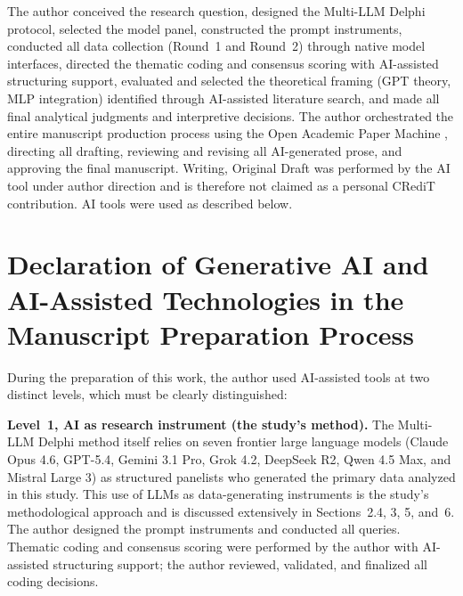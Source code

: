 \documentclass[preprint,review,12pt]{elsarticle}
\begin{document}
The author conceived the research question, designed the Multi-LLM Delphi protocol, selected the model panel, constructed the prompt instruments, conducted all data collection (Round~1 and Round~2) through native model interfaces, directed the thematic coding and consensus scoring with AI-assisted structuring support, evaluated and selected the theoretical framing (GPT theory, MLP integration) identified through AI-assisted literature search, and made all final analytical judgments and interpretive decisions. The author orchestrated the entire manuscript production process using the Open Academic Paper Machine \citep{anonymized2026openpapermachine}, directing all drafting, reviewing and revising all AI-generated prose, and approving the final manuscript. Writing, Original Draft was performed by the AI tool under author direction and is therefore not claimed as a personal CRediT contribution. AI tools were used as described below.

\section*{Declaration of Generative AI and AI-Assisted Technologies in the Manuscript Preparation Process}

During the preparation of this work, the author used AI-assisted tools at two distinct levels, which must be clearly distinguished:

\textbf{Level~1, AI as research instrument (the study's method).} The Multi-LLM Delphi method itself relies on seven frontier large language models (Claude Opus 4.6, GPT-5.4, Gemini 3.1 Pro, Grok 4.2, DeepSeek R2, Qwen 4.5 Max, and Mistral Large 3) as structured panelists who generated the primary data analyzed in this study. This use of LLMs as data-generating instruments is the study's methodological approach and is discussed extensively in Sections~2.4, 3, 5, and~6. The author designed the prompt instruments and conducted all queries. Thematic coding and consensus scoring were performed by the author with AI-assisted structuring support; the author reviewed, validated, and finalized all coding decisions.
\end{document}
